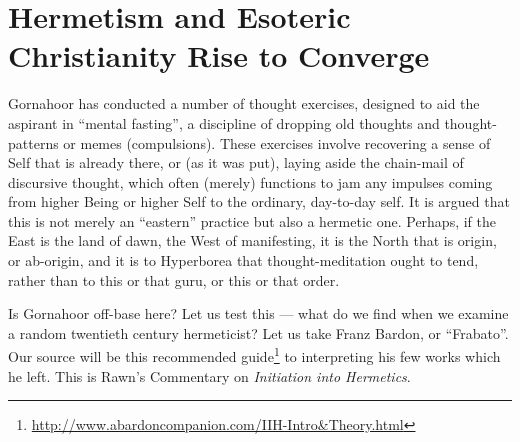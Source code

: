 \section{Hermetism and Esoteric Christianity Rise to Converge}

Gornahoor has conducted a number of thought exercises, designed to aid the aspirant in ``mental fasting'', a discipline of dropping old thoughts and thought-patterns or memes (compulsions). These exercises involve recovering a sense of Self that is already there, or (as it was put), laying aside the chain-mail of discursive thought, which often (merely) functions to jam any impulses coming from higher Being or higher Self to the ordinary, day-to-day self. It is argued that this is not merely an ``eastern'' practice but also a hermetic one. Perhaps, if the East is the land of dawn, the West of manifesting, it is the North that is origin, or ab-origin, and it is to Hyperborea that thought-meditation ought to tend, rather than to this or that guru, or this or that order.

Is Gornahoor off-base here? Let us test this --- what do we find when we examine a random twentieth century hermeticist? Let us take Franz Bardon, or ``Frabato''. Our source will be this recommended guide\footnote{\url{http://www.abardoncompanion.com/IIH-Intro\&Theory.html}} to interpreting his few works which he left. This is Rawn's Commentary on \emph{Initiation into Hermetics}.

